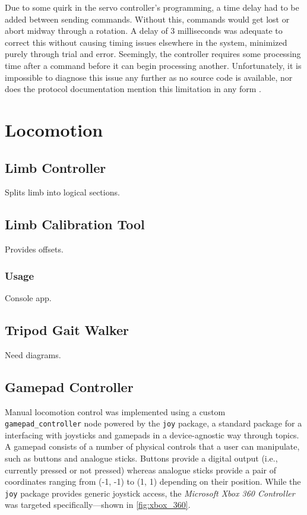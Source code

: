 Due to some quirk in the servo controller's programming, a time delay had to be added between sending commands. Without this, commands would get lost or abort midway through a rotation. A delay of 3 milliseconds was adequate to correct this without causing timing issues elsewhere in the system, minimized purely through trial and error. Seemingly, the controller requires some processing time after a command before it can begin processing another. Unfortunately, it is impossible to diagnose this issue any further as no source code is available, nor does the protocol documentation mention this limitation in any form \cite{torobot_manual}.


\section{Locomotion}

\subsection{Limb Controller}

Splits limb into logical sections.

\subsection{Limb Calibration Tool}

Provides offsets.

\subsubsection{Usage}

Console app.

\subsection{Tripod Gait Walker}

Need diagrams.

\subsection{Gamepad Controller}

Manual locomotion control was implemented using a custom \texttt{gamepad\_controller} node powered by the \texttt{joy} package, a standard package for a interfacing with joysticks and gamepads in a device-agnostic way through topics. A gamepad consists of a number of physical controls that a user can manipulate, such as buttons and analogue sticks. Buttons provide a digital output (i.e., currently pressed or not pressed) whereas analogue sticks provide a pair of coordinates ranging from (-1, -1) to (1, 1) depending on their position. While the \texttt{joy} package provides generic joystick access, the \emph{Microsoft Xbox 360 Controller} was targeted specifically---shown in \autoref{fig:xbox_360}.

